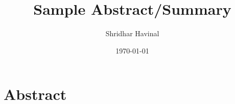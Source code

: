 \documentclass{article}
\title{Sample Abstract/Summary}
\author{Shridhar Havinal}
\date{\today}
\begin{document}
	
	\maketitle
	
	\section*{Abstract}
	 \lipsum[1]
	 
	 \vspace{0.5cm}
	 
	 \lipsum[3]
	 
	
\end{document}
